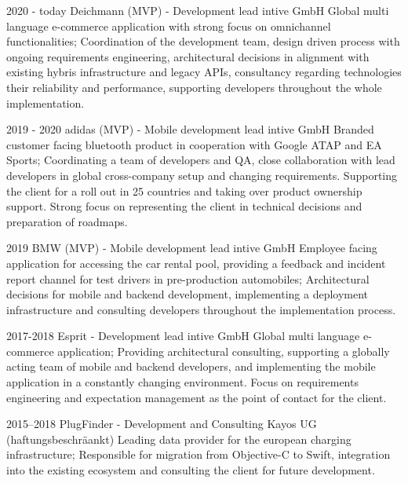 \documentclass[]{friggeri-cv} %
\begin{document}
\begin{entrylist}
	
	\entry
	{2020 - today}
	{Deichmann (MVP) - Development lead}
	{intive GmbH}
	{Global multi language e-commerce application with strong focus on omnichannel functionalities; Coordination of the development team, design driven process with ongoing requirements engineering, architectural decisions in alignment with existing hybris infrastructure and legacy APIs, consultancy regarding technologies their reliability and performance, supporting developers throughout the whole implementation.}

	
	\entry
	{2019 - 2020}
	{adidas (MVP) - Mobile development lead}
	{intive GmbH}
	{Branded customer facing bluetooth product in cooperation with Google ATAP and EA Sports; Coordinating a team of developers and QA, close collaboration with lead developers in global cross-company setup and changing requirements. Supporting the client for a roll out in 25 countries and taking over product ownership support. Strong focus on representing the client in technical decisions and preparation of roadmaps.}
	
	
	
	\entry
	{2019}
	{BMW (MVP) - Mobile development lead}
	{intive GmbH}
	{Employee facing application for accessing the car rental pool, providing a feedback and incident report channel for test drivers in pre-production automobiles; Architectural decisions for mobile and backend development, implementing a deployment infrastructure and consulting developers throughout the implementation process.}
	
	
	\entry
	{2017-2018}
	{Esprit - Development lead}
	{intive GmbH}
	{Global multi language e-commerce application; Providing architectural consulting, supporting a globally acting team of mobile and backend developers, and implementing the mobile application in a constantly changing environment. Focus on requirements engineering and expectation management as the point of contact for the client.}
	
	
	\entry
	{2015--2018}
	{PlugFinder - Development and Consulting}
	{Kayos UG (haftungsbeschr\"{a}ankt)}
	{Leading data provider for the european charging infrastructure; Responsible for migration from Objective-C to Swift, integration into the existing ecosystem and consulting the client for future development.}

\end{entrylist}
\end{document}
